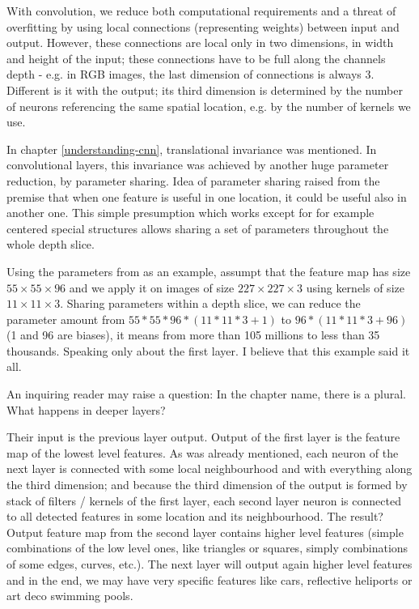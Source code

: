 With convolution, we reduce both computational requirements and a threat of overfitting by using local connections (representing weights) between input and output. However, these connections are local only in two dimensions, in width and height of the input; these connections have to be full along the channels depth - e.g. in RGB images, the last dimension of connections is always 3. Different is it with the output; its third dimension is determined by the number of neurons referencing the same spatial location, e.g. by the number of kernels we use. 

In chapter \ref{understanding-cnn}, translational invariance was mentioned. In convolutional layers, this invariance was achieved by another huge parameter reduction, by parameter sharing. Idea of parameter sharing raised from the premise that when one feature is useful in one location, it could be useful also in another one. This simple presumption which works except for for example centered special structures allows sharing a set of parameters throughout the whole depth slice. 

Using the parameters from \cite{conv-imagenet} as an example, assumpt that the feature map has size $55 \times 55 \times 96$ and we apply it on images of size $227 \times 227 \times 3$ using kernels of size $11 \times 11 \times 3$. Sharing parameters within a depth slice, we can reduce the parameter amount from $55 * 55 * 96 * (11 * 11 * 3 + 1)$ to $96 * (11 * 11 * 3 + 96)$ (1 and 96 are biases), it means from more than 105 millions to less than 35 thousands. Speaking only about the first layer. I believe that this example said it all. 

An inquiring reader may raise a question: In the chapter name, there is a plural. What happens in deeper layers? 

Their input is the previous layer output. Output of the first layer is the feature map of the lowest level features. As was already mentioned, each neuron of the next layer is connected with some local neighbourhood and with everything along the third dimension; and because the third dimension of the output is formed by stack of filters / kernels of the first layer, each second layer neuron is connected to all detected features in some location and its neighbourhood. The result? Output feature map from the second layer contains higher level features (simple combinations of the low level ones, like triangles or squares, simply combinations of some edges, curves, etc.). The next layer will output again higher level features and in the end, we may have very specific features like cars, reflective heliports or art deco swimming pools. 


